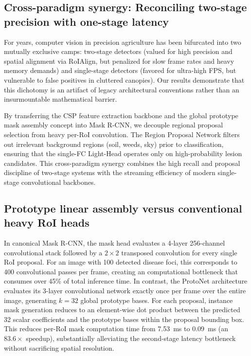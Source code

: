 \documentclass[5p,times]{elsarticle}
\begin{document}
\subsection{Cross-paradigm synergy: Reconciling two-stage precision with one-stage latency}
For years, computer vision in precision agriculture has been bifurcated into two mutually exclusive camps: two-stage detectors (valued for high precision and spatial alignment via RoIAlign, but penalized for slow frame rates and heavy memory demands) and single-stage detectors (favored for ultra-high FPS, but vulnerable to false positives in cluttered canopies). Our results demonstrate that this dichotomy is an artifact of legacy architectural conventions rather than an insurmountable mathematical barrier.

By transferring the CSP feature extraction backbone and the global prototype mask assembly concept into Mask R-CNN, we decouple regional proposal selection from heavy per-RoI convolution. The Region Proposal Network filters out irrelevant background regions (soil, weeds, sky) prior to classification, ensuring that the single-FC Light-Head operates only on high-probability lesion candidates. This cross-paradigm synergy combines the high recall and proposal discipline of two-stage systems with the streaming efficiency of modern single-stage convolutional backbones.

\subsection{Prototype linear assembly versus conventional heavy RoI heads}
In canonical Mask R-CNN, the mask head evaluates a 4-layer 256-channel convolutional stack followed by a $2 \times 2$ transposed convolution for every single RoI proposal. For an image with 100 detected disease foci, this corresponds to 400 convolutional passes per frame, creating an computational bottleneck that consumes over 45\% of total inference time. In contrast, the ProtoNet architecture evaluates its 3-layer convolutional network exactly once per frame over the entire image, generating $k=32$ global prototype bases. For each proposal, instance mask generation reduces to an element-wise dot product between the predicted 32 scalar coefficients and the prototype bases within the proposal bounding box. This reduces per-RoI mask computation time from 7.53~ms to 0.09~ms (an $83.6\times$ speedup), substantially alleviating the second-stage latency bottleneck without sacrificing spatial resolution.
\end{document}
